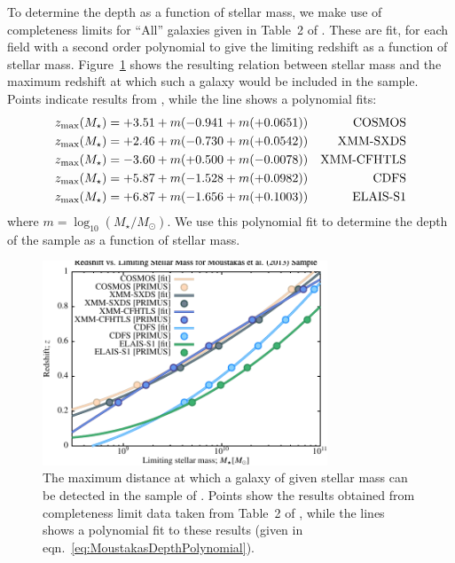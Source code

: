To determine the depth as a function of stellar mass, we make use of completeness limits for ``All'' galaxies given in Table~2 of \cite{moustakas_primus:_2013}. These are fit, for each field with a second order polynomial to give the limiting redshift as a function of stellar mass. Figure~\ref{fig:MoustakasPRIMUSDepthFit} shows the resulting relation between stellar mass and the maximum redshift at which such a galaxy would be included in the sample. Points indicate results from \cite{moustakas_primus:_2013}, while the line shows a polynomial fits:
\begin{eqnarray}
z_{\rm max}(M_\star) = +3.51+m(-0.941+m(+0.0651)) & & \hbox{COSMOS} \\
z_{\rm max}(M_\star) = +2.46+m(-0.730+m(+0.0542)) & & \hbox{XMM-SXDS} \\
z_{\rm max}(M_\star) = -3.60+m(+0.500+m(-0.0078)) & & \hbox{XMM-CFHTLS} \\
z_{\rm max}(M_\star) = +5.87+m(-1.528+m(+0.0982)) & & \hbox{CDFS} \\
z_{\rm max}(M_\star) = +6.87+m(-1.656+m(+0.1003)) & & \hbox{ELAIS-S1}
 \label{eq:MoustakasDepthPolynomial}
\end{eqnarray}
where $m= \log_{10}(M_\star/M_\odot)$. We use this polynomial fit to determine the depth of the sample as a function of stellar mass.

\begin{figure}
 \begin{center}
 \includegraphics[width=85mm,trim=0mm 0mm 0mm 4mm,clip]{Plots/DataAnalysis/MoustakasPRIMUSMassRedshiftRelation.pdf}
 \end{center}
 \caption{The maximum distance at which a galaxy of given stellar mass can be detected in the sample of \protect\cite{moustakas_primus:_2013}. Points show the results obtained from completeness limit data taken from Table~2 of \protect\cite{moustakas_primus:_2013}, while the lines shows a polynomial fit to these results (given in eqn.~\ref{eq:MoustakasDepthPolynomial}).}
 \label{fig:MoustakasPRIMUSDepthFit}
\end{figure}

